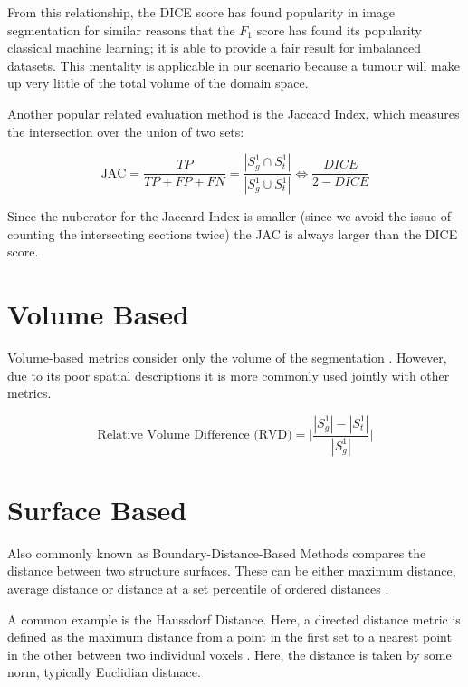 \documentclass[11pt,twoside]{report}
\begin{document}
From this relationship, the DICE score has found popularity in image segmentation for similar reasons that the $F_1$ score has found its popularity classical machine learning; it is able to provide a fair result for imbalanced datasets. This mentality is applicable in our scenario because a tumour will make up very little of the total volume of the domain space.

Another popular related evaluation method is the Jaccard Index, which measures the intersection over the union of two sets:

\begin{equation*}
  \text{JAC} = \frac{TP}{TP+FP+FN} = \frac{|S_g^1\cap S_t^1|}{|S_g^1 \cup S_t^1|} \iff \frac{DICE}{2 - DICE}
\end{equation*}

Since the nuberator for the Jaccard Index is smaller (since we avoid the issue of counting the intersecting sections twice) the JAC is always larger than the DICE score.

\section{Volume Based}

Volume-based metrics consider only the volume of the segmentation \cite{evaluation-of-metrics-in-prostate,review-metrics, boundary-overlap-metrics}. However, due to its poor spatial descriptions it is more commonly used jointly with other metrics.

\begin{equation*}
  \text{Relative Volume Difference (RVD)} = \bigg| \frac{|S_g^1|-|S_t^1|}{|S_g^1|}\bigg|
\end{equation*}

\section{Surface Based}

Also commonly known as Boundary-Distance-Based Methods \cite{boundary-overlap-metrics} compares the distance between two structure
surfaces. These can be either maximum distance, average distance or distance at a set percentile of ordered distances \cite{evaluation-metrics}.

A common example is the Haussdorf Distance. Here, a directed distance metric is defined as the maximum distance from a point in the first set to a nearest point in the other between two individual voxels \cite{boundary-overlap-metrics}. Here, the distance is taken by some norm, typically Euclidian distnace.
\end{document}
